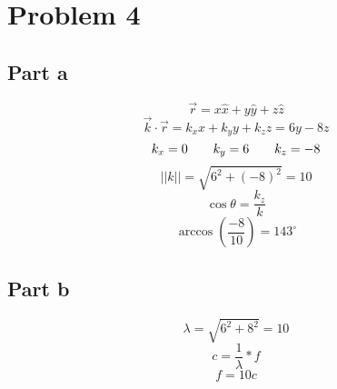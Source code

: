 \documentclass{article}
\begin{document}
\section*{Problem 4}
\subsection*{Part a}
\[\overrightarrow{r}=x\hat{x}+y\hat{y}+z\hat{z}\]
\[\overrightarrow{k}\cdot\overrightarrow{r}=k_xx+k_yy+k_zz=6y-8z\]
\[k_x=0\hspace{7 mm}k_y=6\hspace{7 mm}k_z=-8\]
\[||k||=\sqrt{6^2+(-8)^2}=10\]
\[\cos \theta=\frac{k_z}{k}\]
\[\arccos\left(\frac{-8}{10}\right)=\boxed{143^{\circ}}\]
\subsection*{Part b}
\[\lambda=\sqrt{6^2+8^2}=10\]
\[c=\frac{1}{\lambda}*f\]
\[f=\boxed{10c}\]
\end{document}
